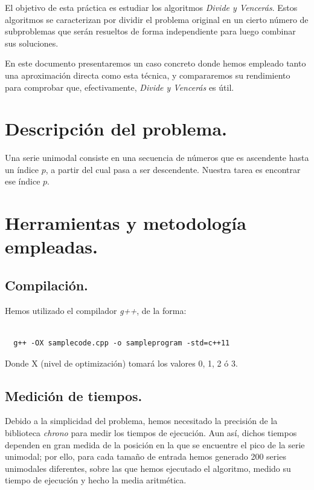 \documentclass[11pt,a4paper]{article}
\begin{document}
		\par
		El objetivo de esta práctica es estudiar los algoritmos \textit{Divide y Vencerás}. Estos algoritmos se caracterizan por dividir el problema original en un cierto número de subproblemas que serán resueltos de forma independiente para luego combinar sus soluciones. \\

		\par
		En este documento presentaremos un caso concreto donde hemos empleado tanto una aproximación directa como esta técnica, y compararemos su rendimiento para comprobar que, efectivamente, \textit{Divide y Vencerás} es útil.

	\section{Descripción del problema.}

		\par
		Una serie unimodal consiste en una secuencia de números que es ascendente hasta un índice $p$, a partir del cual pasa a ser descendente. Nuestra tarea es encontrar ese índice $p$.

	\section{Herramientas y metodología empleadas.}


		\subsection{Compilación.}

			\par
			\noindent
			Hemos utilizado el compilador \textit{g++}, de la forma:

			\begin{verbatim}

  g++ -OX samplecode.cpp -o sampleprogram -std=c++11

			\end{verbatim}

			\par
			\noindent
			Donde X (nivel de optimización) tomará los valores 0, 1, 2 ó 3.

		\subsection{Medición de tiempos.}

			\par
			Debido a la simplicidad del problema, hemos necesitado la precisión de la biblioteca \textit{chrono} para medir los tiempos de ejecución. Aun así, dichos tiempos dependen en gran medida de la posición en la que se encuentre el pico de la serie unimodal; por ello, para cada tamaño de entrada hemos generado 200 series unimodales diferentes, sobre las que hemos ejecutado el algoritmo, medido su tiempo de ejecución y hecho la media aritmética.
\end{document}
